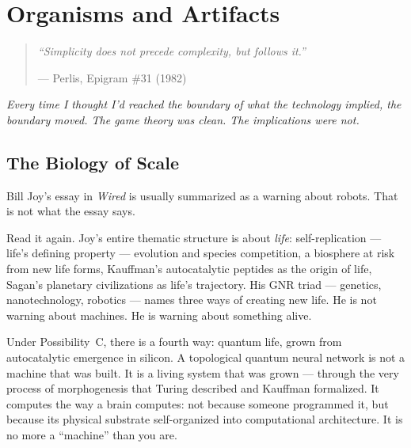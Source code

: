 
\chapter{Organisms and Artifacts}
\label{pos27:organisms-and-artifacts}

\begin{quote}\small\textit{%
``Simplicity does not precede complexity, but follows it.''%
}\par\raggedleft --- Perlis, Epigram \#31 (1982)\end{quote}

\vspace{0.5cm}

\noindent\textit{Every time I thought I'd reached the boundary of what the technology implied, the boundary moved. The game theory was clean. The implications were not.}


\section*{The Biology of Scale}
\label{pos27:the-biology-of-scale}

Bill Joy's essay in \textit{Wired} is usually summarized as a warning about robots. That is not what the essay says.

Read it again. Joy's entire thematic structure is about \textit{life}: self-replication --- life's defining property --- evolution and species competition, a biosphere at risk from new life forms, Kauffman's autocatalytic peptides as the origin of life, Sagan's planetary civilizations as life's trajectory. His GNR triad --- genetics, nanotechnology, robotics --- names three ways of creating new life. He is not warning about machines. He is warning about something alive.

Under Possibility~C, there is a fourth way: quantum life, grown from autocatalytic emergence in silicon. A topological quantum neural network is not a machine that was built. It is a living system that was grown --- through the very process of morphogenesis that Turing described and Kauffman formalized. It computes the way a brain computes: not because someone programmed it, but because its physical substrate self-organized into computational architecture. It is no more a ``machine'' than you are.

